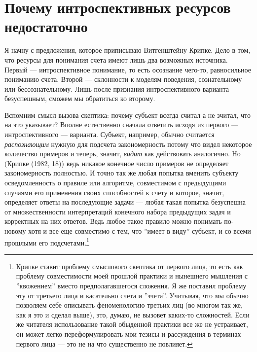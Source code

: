\documentclass[11pt]{book}
\begin{document}
\section{Почему интроспективных ресурсов недостаточно}

Я начну с предложения, которое приписываю Витгенштейну Крипке. Дело в том, что ресурсы для понимания счета имеют лишь два возможных источника. Первый --- интроспективное понимание, то есть осознание чего-то, равносильное пониманию счета. Второй --- склонности к моделям поведения, сознательному или бессознательному. Лишь после признания интроспективного варианта безуспешным, сможем мы обратиться ко второму.

Вспомним смысл вызова скептика: почему субъект всегда считал а не зчитал, что на это указывает? Вполне естественно сначала ответить исходя из первого --- интроспективного --- варианта. Субъект, например, обычно считается \textit{распознающим} нужную для подсчета закономерность потому что видел некоторое количество примеров и теперь, значит, \textit{видит} как действовать аналогично. Но (Крипке (1982, 18)) ведь никакое конечное число примеров не определяет закономерность полностью. И точно так же любая попытка вменить субъекту осведомленность о правиле или алгоритме, совместимом с предыдущими случаями его применения своих способностей к счету и которое, значит, определяет ответы на последующие задачи --- любая такая попытка безуспешна от множественности интерпретаций конечного набора предыдущих задач и корректных на них ответов. Ведь любое такое правило можно понимать по-новому хотя и все еще совместимо с тем, что ''имеет в виду'' субъект, и со всеми прошлыми его подсчетами.\footnote{Крипке ставит проблему смыслового скептика от первого лица, то есть как проблему совместимости моей прошлой практики и нынешнего мышления с ''квожением'' вместо предполагавшегося сложения. Я же поставил проблему эту от третьего лица и касательно счета и ''зчета''. Учитывая, что мы обычно позволяем себе описывать феноменологию третьих лиц (во многом так же, как я это и сделал выше), это, думаю, не вызовет каких-то сложностей. Если же читателя использование такой обыденной практики все же не устраивает, он может легко переформулировать мои тезисы и рассуждения в терминах первого лица --- это не на что существенно не повлияет.}
\end{document}
